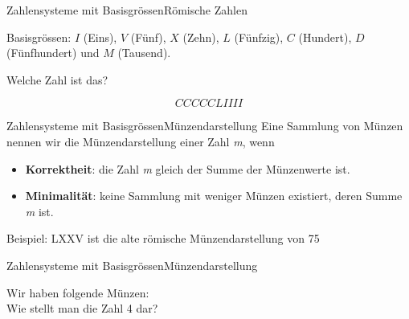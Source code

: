 \begin{frame}{Zahlensysteme mit Basisgrössen}{Römische Zahlen}

\begin{center}
Basisgrössen: $I$ (Eins), $V$ (Fünf), $X$ (Zehn), $L$ (Fünfzig), $C$ (Hundert), $D$ (Fünfhundert) und $M$ (Tausend).
\end{center}
\begin{center}
Welche Zahl ist das?
\end{center}

  \begin{equation*}
    CCCCCLIIII
  \end{equation*}
  

\end{frame}

\begin{frame}{Zahlensysteme mit Basisgrössen}{Münzendarstellung}
Eine Sammlung von Münzen nennen wir die Münzendarstellung einer Zahl \textit{m}, wenn
\begin{itemize}
\item \textbf{Korrektheit}: die Zahl \textit{m} gleich der Summe der Münzenwerte ist.
\item \textbf{Minimalität}: keine Sammlung mit weniger Münzen existiert, deren Summe \textit{m} ist.
\end{itemize}

Beispiel: LXXV ist die alte römische Münzendarstellung von 75

\end{frame}


\begin{frame}{Zahlensysteme mit Basisgrössen}{Münzendarstellung}

Wir haben folgende Münzen: \\

Wie stellt man die Zahl 4 dar?

\end{frame}

